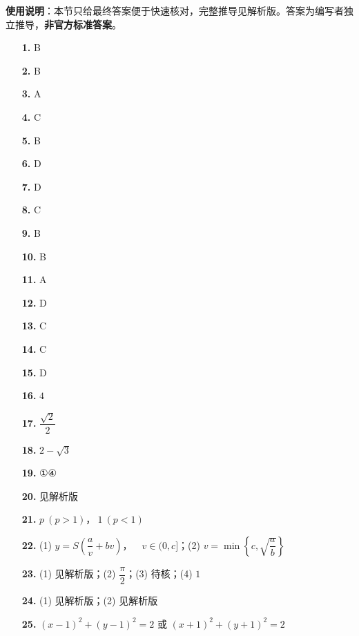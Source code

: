 
\begin{gknotice}
\textbf{使用说明}：本节只给最终答案便于快速核对，完整推导见解析版。答案为编写者独立推导，\textbf{非官方标准答案}。
\end{gknotice}

\begin{itemize}[leftmargin=2.6em]
  \item[\textbf{1.}] B
  \item[\textbf{2.}] B
  \item[\textbf{3.}] A
  \item[\textbf{4.}] C
  \item[\textbf{5.}] B
  \item[\textbf{6.}] D
  \item[\textbf{7.}] D
  \item[\textbf{8.}] C
  \item[\textbf{9.}] B
  \item[\textbf{10.}] B
  \item[\textbf{11.}] A
  \item[\textbf{12.}] D
  \item[\textbf{13.}] C
  \item[\textbf{14.}] C
  \item[\textbf{15.}] D
  \item[\textbf{16.}] $4$
  \item[\textbf{17.}] $\dfrac{\sqrt2}{2}$
  \item[\textbf{18.}] $2-\sqrt3$
  \item[\textbf{19.}] ①④
  \item[\textbf{20.}] 见解析版
  \item[\textbf{21.}] $p\ (p>1)\text{，}\ 1\ (p<1)$
  \item[\textbf{22.}] (1) $y=S\left(\dfrac av+bv\right)\text{，}\quad v\in(0,c]$；(2) $v=\min\left\{c,\sqrt{\dfrac ab}\right\}$
  \item[\textbf{23.}] (1) 见解析版；(2) $\dfrac\pi2$；(3) 待核；(4) $1$
  \item[\textbf{24.}] (1) 见解析版；(2) 见解析版
  \item[\textbf{25.}] $(x-1)^2+(y-1)^2=2$ 或 $(x+1)^2+(y+1)^2=2$
\end{itemize}
